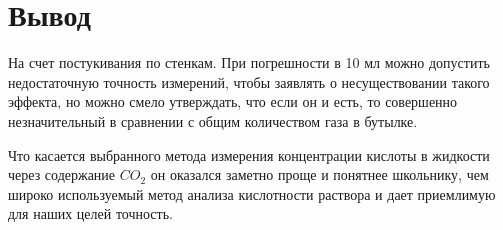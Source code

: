 \documentclass[12pt,a4paper]{scrartcl}
\begin{document}
\section{Вывод}
На счет постукивания по стенкам. При погрешности в 10 мл можно допустить недостаточную точность измерений, чтобы заявлять о несуществовании такого эффекта, но можно смело утверждать, что если он и есть, то совершенно незначительный в сравнении с общим количеством газа в бутылке.

Что касается выбранного метода измерения концентрации кислоты в жидкости через содержание $CO_2$ он оказался заметно проще и понятнее школьнику, чем широко используемый метод анализа кислотности раствора и дает приемлимую для наших целей точность.
\end{document}
